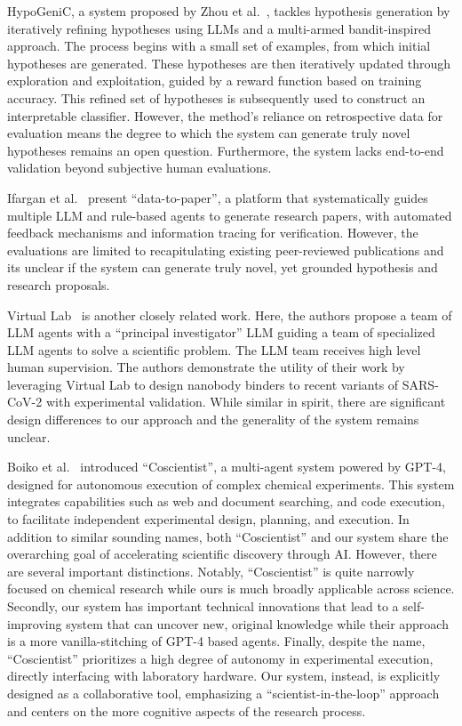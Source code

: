 HypoGeniC, a system proposed by Zhou et al.~\cite{zhou2022least}, tackles hypothesis generation by iteratively refining hypotheses using LLMs and a multi-armed bandit-inspired approach. The process begins with a small set of examples, from which initial hypotheses are generated. These hypotheses are then iteratively updated through exploration and exploitation, guided by a reward function based on training accuracy.  This refined set of hypotheses is subsequently used to construct an interpretable classifier. However, the method's reliance on retrospective data for evaluation means the degree to which the system can generate truly novel hypotheses remains an open question. Furthermore, the system lacks end-to-end validation beyond subjective human evaluations.

Ifargan et al.~\cite{ifargan2025autonomous} present ``data-to-paper'', a platform that systematically guides multiple LLM and rule-based agents to generate research papers, with automated feedback mechanisms and information tracing for verification. However, the evaluations are limited to recapitulating existing peer-reviewed publications and its unclear if the system can generate truly novel, yet grounded hypothesis and research proposals.

Virtual Lab~\citep{swanson2024virtual} is another closely related work. Here, the authors propose a team of LLM agents with a ``principal investigator'' LLM guiding a team of specialized LLM agents to solve a scientific problem. The LLM team receives high level human supervision. The authors demonstrate the utility of their work by leveraging Virtual Lab to design nanobody binders to recent variants of SARS-CoV-2 with experimental validation. While similar in spirit, there are significant design differences to our approach and the generality of the system remains unclear.

Boiko et al.~\citep{boiko2023autonomous} introduced ``Coscientist'', a multi-agent system powered by GPT-4, designed for autonomous execution of complex chemical experiments. This system integrates capabilities such as web and document searching, and code execution, to facilitate independent experimental design, planning, and execution. In addition to similar sounding names, both ``Coscientist'' and our system share the overarching goal of accelerating scientific discovery through AI. However, there are several important distinctions. Notably, ``Coscientist'' is quite narrowly focused on chemical research while ours is much broadly applicable across science. Secondly, our system has important technical innovations that lead to a self-improving system that can uncover new, original knowledge while their approach is a more vanilla-stitching of GPT-4 based agents. Finally, despite the name, ``Coscientist'' prioritizes a high degree of autonomy in experimental execution, directly interfacing with laboratory hardware. Our system, instead, is explicitly designed as a collaborative tool, emphasizing a ``scientist-in-the-loop'' approach and centers on the more cognitive aspects of the research process.

